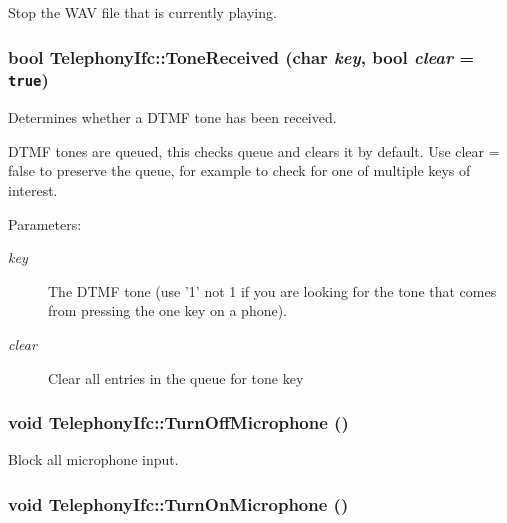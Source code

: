 Stop the WAV file that is currently playing. 

\hypertarget{classTelephonyIfc_60cba0b92e2f33357c063c251fae2997}{
\subsubsection[{ToneReceived}]{\setlength{\rightskip}{0pt plus 5cm}bool TelephonyIfc::ToneReceived (char {\em key}, \/  bool {\em clear} = {\tt true})}}
\label{classTelephonyIfc_60cba0b92e2f33357c063c251fae2997}


Determines whether a DTMF tone has been received. 

DTMF tones are queued, this checks queue and clears it by default. Use clear = false to preserve the queue, for example to check for one of multiple keys of interest.

\begin{Desc}
\item[Parameters:]
\begin{description}
\item[{\em key}]The DTMF tone (use '1' not 1 if you are looking for the tone that comes from pressing the one key on a phone). \item[{\em clear}]Clear all entries in the queue for tone key \end{description}
\end{Desc}
\hypertarget{classTelephonyIfc_4b81a2cfb03620cd829e8da73dfe0ea4}{
\subsubsection[{TurnOffMicrophone}]{\setlength{\rightskip}{0pt plus 5cm}void TelephonyIfc::TurnOffMicrophone ()}}
\label{classTelephonyIfc_4b81a2cfb03620cd829e8da73dfe0ea4}


Block all microphone input. 

\hypertarget{classTelephonyIfc_d5ecca9d510408b2ce43cb5b5071b357}{
\subsubsection[{TurnOnMicrophone}]{\setlength{\rightskip}{0pt plus 5cm}void TelephonyIfc::TurnOnMicrophone ()}}
\label{classTelephonyIfc_d5ecca9d510408b2ce43cb5b5071b357}


